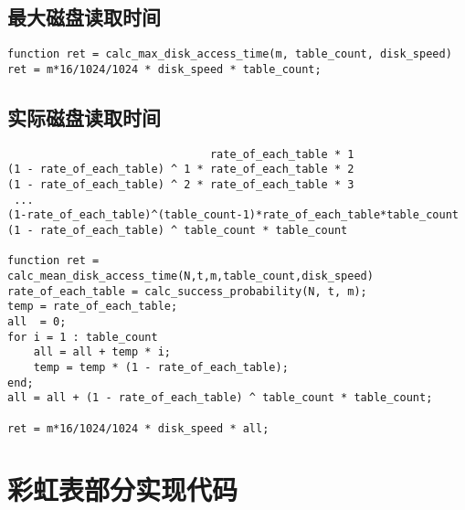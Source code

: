 \section{最大磁盘读取时间}
\begin{lstlisting}
function ret = calc_max_disk_access_time(m, table_count, disk_speed)
ret = m*16/1024/1024 * disk_speed * table_count;
\end{lstlisting}
\section{实际磁盘读取时间}
\begin{lstlisting}
                               rate_of_each_table * 1 
(1 - rate_of_each_table) ^ 1 * rate_of_each_table * 2 
(1 - rate_of_each_table) ^ 2 * rate_of_each_table * 3 
 ...
(1-rate_of_each_table)^(table_count-1)*rate_of_each_table*table_count
(1 - rate_of_each_table) ^ table_count * table_count 

function ret = calc_mean_disk_access_time(N,t,m,table_count,disk_speed)
rate_of_each_table = calc_success_probability(N, t, m);
temp = rate_of_each_table;
all  = 0;
for i = 1 : table_count
    all = all + temp * i;
    temp = temp * (1 - rate_of_each_table);
end;
all = all + (1 - rate_of_each_table) ^ table_count * table_count;

ret = m*16/1024/1024 * disk_speed * all;
\end{lstlisting}
\chapter{彩虹表部分实现代码}
